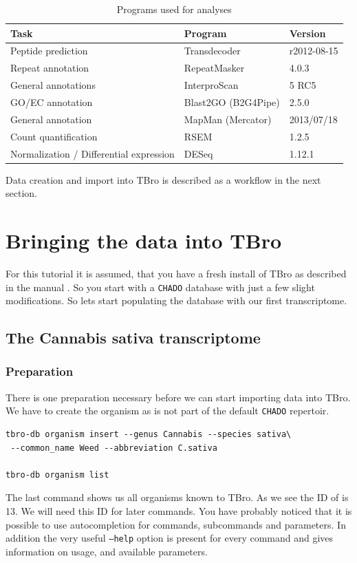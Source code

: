 \documentclass[english]{scrartcl}
\begin{document}
\begin{table}
\caption{Programs used for analyses}
\label{tab:PROGRAMS}
\begin{tabularx}{\textwidth}{Xll}
\toprule
Task & Program & Version\\
\midrule
Peptide prediction & Transdecoder & r2012-08-15\\
Repeat annotation & RepeatMasker & 4.0.3 \\
General annotations & InterproScan & 5 RC5\\
GO/EC annotation & Blast2GO (B2G4Pipe) & 2.5.0\\
General annotation & MapMan (Mercator) & 2013/07/18\\
Count quantification & RSEM & 1.2.5 \\
Normalization / Differential expression & DESeq & 1.12.1 \\
\bottomrule
\end{tabularx}
\end{table}

Data creation and import into TBro is described as a workflow in the next
section.


\section{Bringing the data into TBro}

For this tutorial it is assumed, that you have a fresh install of
TBro as described in the manual \cite{DIP_TBRO}. So you start with a \texttt{CHADO}
database with just a few slight modifications. So lets start populating
the database with our first transcriptome.

\subsection{The Cannabis sativa transcriptome}
\subsubsection{Preparation}
There is one preparation necessary before we can start importing data into TBro.
We have to create the organism as  is not part of the default
\texttt{CHADO} repertoir.
\begin{lstlisting}[style=Bash]
tbro-db organism insert --genus Cannabis --species sativa\
 --common_name Weed --abbreviation C.sativa
 
tbro-db organism list
\end{lstlisting} 
The last command shows us all organisms known to TBro. As we see the ID of
\plant{CS} is 13. We will need this ID for later commands.
You have probably noticed that it is possible to use autocompletion for
commands, subcommands and parameters. In addition the very useful
\texttt{--help} option is present for every command and gives information on
usage, and available parameters.
\end{document}
